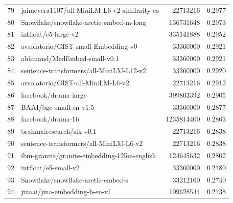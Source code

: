 {\begin{xltabular}{\textwidth}{l X rc}
    79               & jaimevera1107/all-MiniLM-L6-v2-similarity-es                               & 22713216      & 0.2977       \\
    80               & Snowflake/snowflake-arctic-embed-m-long                                    & 136731648     & 0.2973       \\
    81               & intfloat/e5-large-v2                                                       & 335141888     & 0.2952       \\
    82               & avsolatorio/GIST-small-Embedding-v0                                        & 33360000      & 0.2921       \\
    83               & abhinand/MedEmbed-small-v0.1                                               & 33360000      & 0.2921       \\
    84               & sentence-transformers/all-MiniLM-L12-v2                                    & 33360000      & 0.2920       \\
    85               & avsolatorio/GIST-all-MiniLM-L6-v2                                          & 22713216      & 0.2912       \\
    86               & facebook/drama-large                                                       & 399803392     & 0.2905       \\
    87               & BAAI/bge-small-en-v1.5                                                     & 33360000      & 0.2877       \\
    88               & facebook/drama-1b                                                          & 1235814400    & 0.2863       \\
    89               & brahmairesearch/slx-v0.1                                                   & 22713216      & 0.2838       \\
    90               & sentence-transformers/all-MiniLM-L6-v2                                     & 22713216      & 0.2838       \\
    91               & ibm-granite/granite-embedding-125m-english                                 & 124645632     & 0.2802       \\
    92               & intfloat/e5-small-v2                                                       & 33360000      & 0.2780       \\
    93               & Snowflake/snowflake-arctic-embed-s                                         & 33212160      & 0.2740       \\
    94               & jinaai/jina-embedding-b-en-v1                                              & 109628544     & 0.2738       \\

\end{xltabular}}
